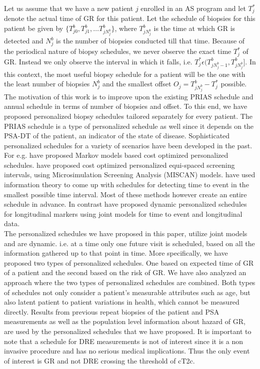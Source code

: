 Let us assume that we have a new patient $j$ enrolled in an AS program and let $T_j^*$ denote the actual time of GR for this patient. Let the schedule of biopsies for this patient be given by $\{T^b_{j0}, T^b_{j1}, \ldots T^b_{j{N_j^b}}\}$, where $T^b_{j{N_j^b}}$ is the time at which GR is detected and $N_j^b$ is the number of biopsies conducted till that time. Because of the periodical nature of biopsy schedules, we never observe the exact time $T_j^*$ of GR. Instead we only observe the interval in which it falls, i.e. $T^*_j \epsilon (T^b_{j{N_j^b - 1}}, T^b_{j{N_j^b}}]$. In this context, the most useful biopsy schedule for a patient will be the one with the least number of biopsies $N_j^b$ and the smallest offset $O_j = T^b_{j{N_j^b}} - T_j^*$ possible. The motivation of this work is to improve upon the existing PRIAS schedule and annual schedule in terms of number of biopsies and offset. To this end, we have proposed personalized biopsy schedules tailored separately for every patient. The PRIAS schedule is a type of personalized schedule as well since it depends on the PSA-DT of the patient, an indicator of the state of disease. Sophisticated personalized schedules for a variety of scenarios have been developed in the past. For e.g. \cite{bebu2017OptimalScreening} have proposed Markov models based cost optimized personalized schedules. \cite{oMahonyOptimaInterval} have proposed cost optimized personalized equi-spaced screening intervals, using Microsimulation Screening Analysis (MISCAN) models. \cite{parmigiani1998designing} have used information theory to come up with schedules for detecting time to event in the smallest possible time interval. Most of these methods however create an entire schedule in advance. In contrast \cite{drizopoulosPersScreening} have proposed dynamic personalized schedules for longitudinal markers using joint models for time to event and longitudinal data\citep{tsiatis2004joint,rizopoulos2012joint}.\\

The personalized schedules we have proposed in this paper, utilize joint models and are dynamic. i.e. at a time only one future visit is scheduled, based on all the information gathered up to that point in time. More specifically, we have proposed two types of personalized schedules. One based on expected time of GR of a patient and the second based on the risk of GR. We have also analyzed an approach where the two types of personalized schedules are combined. Both types of schedules not only consider a patient's measurable attributes such as age, but also latent patient to patient variations in health, which cannot be measured directly. Results from previous repeat biopsies of the patient and PSA measurements as well as the population level information about hazard of GR, are used by the personalized schedules that we have proposed. It is important to note that a schedule for DRE measurements is not of interest since it is a non invasive procedure and has no serious medical implications. Thus the only event of interest is GR and not DRE crossing the threshold of cT2c.\\

